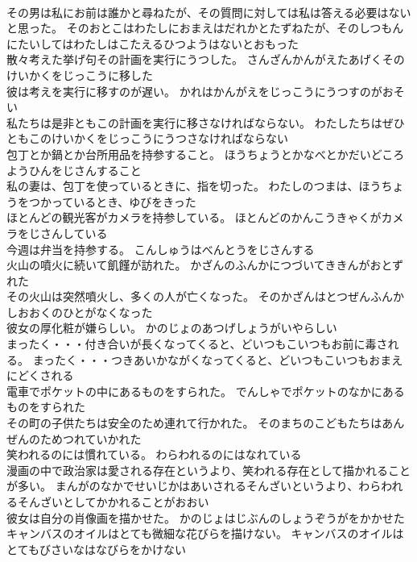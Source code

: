 \documentclass[8pt]{extreport}
\begin{document}
\begin{CJK}{UTF8}{min}
\\	その男は私にお前は誰かと尋ねたが、その質問に対しては私は答える必要はないと思った。	そのおとこはわたしにおまえはだれかとたずねたが、そのしつもんにたいしてはわたしはこたえるひつようはないとおもった 
\\	散々考えた挙げ句その計画を実行にうつした。	さんざんかんがえたあげくそのけいかくをじっこうに移した 
\\	彼は考えを実行に移すのが遅い。	かれはかんがえをじっこうにうつすのがおそい 
\\	私たちは是非ともこの計画を実行に移さなければならない。	わたしたちはぜひともこのけいかくをじっこうにうつさなければならない 
\\	包丁とか鍋とか台所用品を持参すること。	ほうちょうとかなべとかだいどころようひんをじさんすること 
\\	私の妻は、包丁を使っているときに、指を切った。	わたしのつまは、ほうちょうをつかっているとき、ゆびをきった 
\\	ほとんどの観光客がカメラを持参している。	ほとんどのかんこうきゃくがカメラをじさんしている 
\\	今週は弁当を持参する。	こんしゅうはべんとうをじさんする 
\\	火山の噴火に続いて飢饉が訪れた。	かざんのふんかにつづいてききんがおとずれた 
\\	その火山は突然噴火し、多くの人が亡くなった。	そのかざんはとつぜんふんかしおおくのひとがなくなった 
\\	彼女の厚化粧が嫌らしい。	かのじょのあつげしょうがいやらしい 
\\	まったく・・・付き合いが長くなってくると、どいつもこいつもお前に毒される。	まったく・・・つきあいかながくなってくると、どいつもこいつもおまえにどくされる 
\\	電車でポケットの中にあるものをすられた。	でんしゃでポケットのなかにあるものをすられた 
\\	その町の子供たちは安全のため連れて行かれた。	そのまちのこどもたちはあんぜんのためつれていかれた 
\\	笑われるのには慣れている。	わらわれるのにはなれている 
\\	漫画の中で政治家は愛される存在というより、笑われる存在として描かれることが多い。	まんがのなかでせいじかはあいされるそんざいというより、わらわれるそんざいとしてかかれることがおおい 
\\	彼女は自分の肖像画を描かせた。	かのじょはじぶんのしょうぞうがをかかせた 
\\	キャンバスのオイルはとても微細な花びらを描けない。	キャンバスのオイルはとてもびさいなはなびらをかけない 

\end{CJK}
\end{document}
